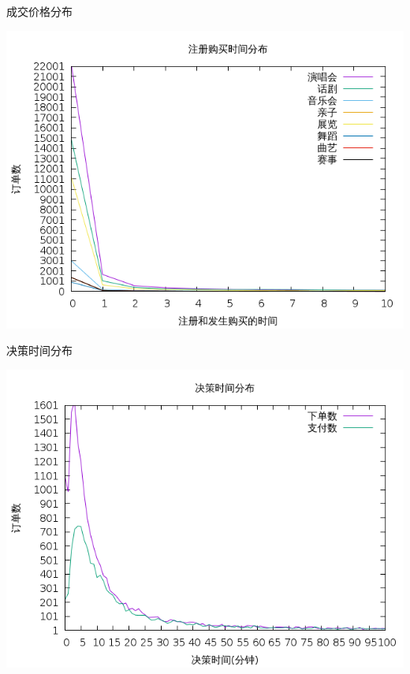 \documentclass[presentation, bigger]{beamer}
\begin{document}
\begin{frame}[label={sec:orgf7ebcbb}]{成交价格分布}
\begin{center}
\includegraphics[width=.9\linewidth]{./image/register-distribution.png}
\end{center}
\end{frame}

\begin{frame}[label={sec:org6fb88ae}]{决策时间分布}
\begin{center}
\includegraphics[width=.9\linewidth]{./image/decision-distribution.png}
\end{center}
\end{frame}
\end{document}
